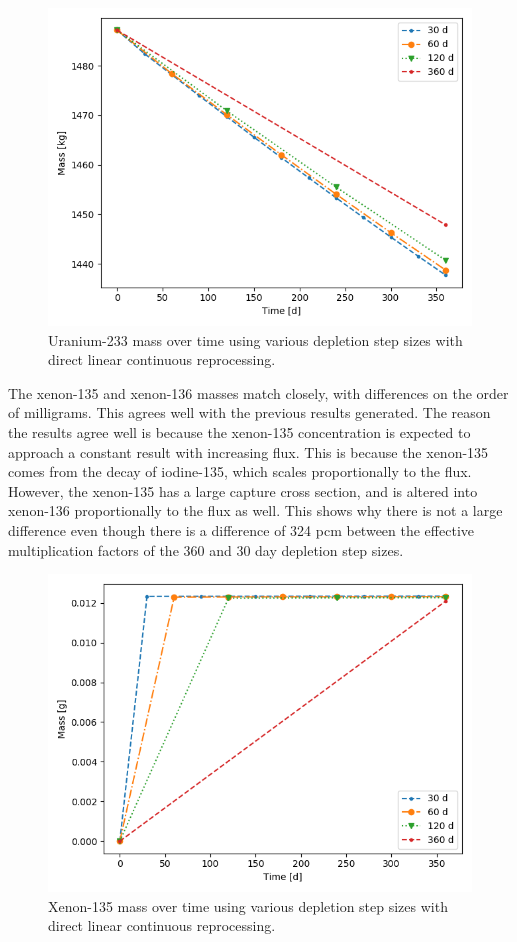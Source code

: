 \begin{figure}[H]
  \centering
  \includegraphics[scale=0.7]{images/DL_NSTEP_U-233_mass-large.png}
  \caption{Uranium-233 mass over time using various depletion step sizes with direct linear continuous reprocessing.}
   \label{fig:DL-cont-u-2}
\end{figure}

The xenon-135 and xenon-136 masses match closely, with differences on the order of milligrams. This agrees well with the previous results generated. The reason the results agree well is because the xenon-135 concentration is expected to approach a constant result with increasing flux. This is because the xenon-135 comes from the decay of iodine-135, which scales proportionally to the flux. However, the xenon-135 has a large capture cross section, and is altered into xenon-136 proportionally to the flux as well. This shows why there is not a large difference even though there is a difference of 324 pcm between the effective multiplication factors of the 360 and 30 day depletion step sizes.

\begin{figure}[H]
  \centering
  \includegraphics[scale=0.7]{images/DL_NSTEP_Xe-135_mass-large.png}
  \caption{Xenon-135 mass over time using various depletion step sizes with direct linear continuous reprocessing.}
   \label{fig:DL-cont-xe135-2}
\end{figure}

